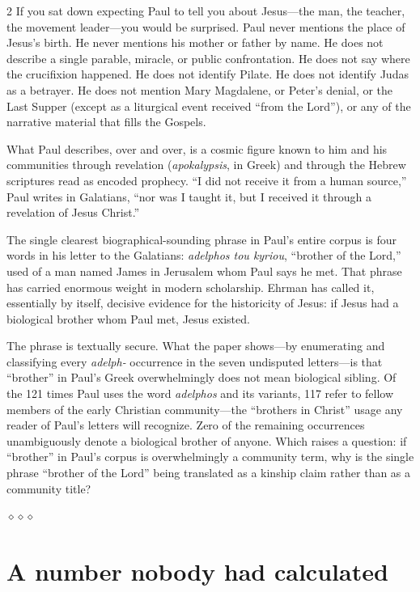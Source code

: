 \documentclass[11pt,oneside]{article}
\newcommand{\sectbreak}{%
  \par\vspace{1.3em}
  \noindent\hfil
  {\color{accent}$\diamond$\hspace{0.5em}$\diamond$\hspace{0.5em}$\diamond$}%
  \hfil\par\vspace{1em}}
\begin{document}
\begin{multicols}{2}
If you sat down expecting Paul to tell you about Jesus---the man,
the teacher, the movement leader---you would be surprised.  Paul
never mentions the place of Jesus's birth.  He never mentions his
mother or father by name.  He does not describe a single parable,
miracle, or public confrontation.  He does not say where the
crucifixion happened.  He does not identify Pilate.  He does not
identify Judas as a betrayer.  He does not mention Mary Magdalene,
or Peter's denial, or the Last Supper (except as a liturgical event
received \enquote{from the Lord}), or any of the narrative material
that fills the Gospels.

What Paul describes, over and over, is a cosmic figure known to him
and his communities through revelation (\textit{apokalypsis}, in
Greek) and through the Hebrew scriptures read as encoded prophecy.
\enquote{I did not receive it from a human source,} Paul writes in
Galatians, \enquote{nor was I taught it, but I received it through
a revelation of Jesus Christ.}

The single clearest biographical-sounding phrase in Paul's entire
corpus is four words in his letter to the Galatians:
\textit{adelphos tou kyriou}, \enquote{brother of the Lord,} used
of a man named James in Jerusalem whom Paul says he met.  That
phrase has carried enormous weight in modern scholarship.  Ehrman
has called it, essentially by itself, decisive evidence for the
historicity of Jesus: if Jesus had a biological brother whom Paul
met, Jesus existed.

The phrase is textually secure.  What the paper shows---by
enumerating and classifying every \textit{adelph-} occurrence in the
seven undisputed letters---is that \enquote{brother} in Paul's
Greek overwhelmingly does not mean biological sibling.  Of the 121
times Paul uses the word \textit{adelphos} and its variants, 117
refer to fellow members of the early Christian community---the
\enquote{brothers in Christ} usage any reader of Paul's letters
will recognize.  Zero of the remaining occurrences unambiguously
denote a biological brother of anyone.  Which raises a question:
if \enquote{brother} in Paul's corpus is overwhelmingly a community
term, why is the single phrase \enquote{brother of the Lord} being
translated as a kinship claim rather than as a community title?

\sectbreak
\section*{A number nobody had calculated}


\end{multicols}
\end{document}
